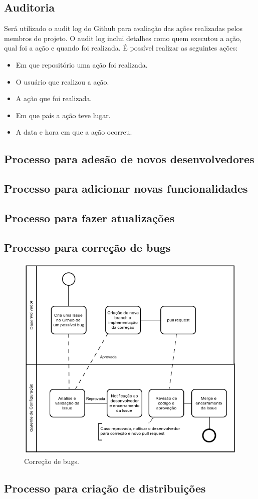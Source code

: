 \documentclass{article}
\begin{document}
		\subsection{Auditoria}
			Será utilizado o audit log do Github para avaliação das ações realizadas pelos membros do projeto. O audit log inclui detalhes como quem executou a ação, qual foi a ação e quando foi realizada.
			\newline
			É possível realizar as seguintes ações:
			\begin{itemize}
				\item Em que repositório uma ação foi realizada.
				\item O usuário que realizou a ação.
				\item A ação que foi realizada.
				\item Em que país a ação teve lugar.
				\item A data e hora em que a ação ocorreu.
			\end{itemize}
        \subsection{Processo para adesão de novos desenvolvedores}
        \subsection{Processo para adicionar novas funcionalidades}
        \subsection{Processo para fazer atualizações}
        \subsection{Processo para correção de bugs}
	        \begin{figure}[H]
	        	\includegraphics[width=\linewidth]{bug.png}
	        	\caption{Correção de bugs.}
	        \end{figure}
        \subsection{Processo para criação de distribuições}
    \newpage
	\begin{appendix}
		\listoffigures
		\listoftables
	\end{appendix}
\end{document}
